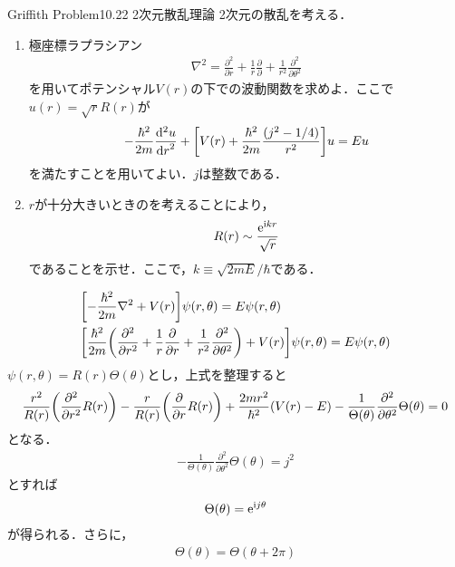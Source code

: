 \documentclass{report}
\begin{document}
  \begin{myexc}{Griffith Problem10.22 2次元散乱理論}{}
    2次元の散乱を考える．
  \begin{enumerate}
    \item 極座標ラプラシアン
    \begin{align}
      \nabla^2 = \frac{\partial^2}{\partial r} + \frac{1}{r}\frac{\partial}{\partial} + \frac{1}{r^2}\frac{\partial^2}{\partial \theta^2}
    \end{align}
    を用いてポテンシャル$V(r)$の下での波動関数を求めよ．ここで$u(r)=\sqrt{r}R(r)$が
    \begin{align}
      -\frac{\hbar^2}{2m}\frac{\mathrm{d}^2 u}{\dd{r}^2} + \qty[V(r) + \frac{\hbar^2}{2m}\frac{(j^2 - 1/4)}{r^2}]u = Eu \label{eq-for-u}
    \end{align}
    を満たすことを用いてよい．$j$は整数である．
    \item $r$が十分大きいときのを考えることにより，
    \begin{align}
      R(r) \sim \frac{\mathrm{e}^{\mathrm{i} kr}}{\sqrt{r}}
    \end{align}
    であることを示せ．ここで，$k\equiv \sqrt{2mE}/\hbar$である．
  \end{enumerate}
    \tcblower
    \begin{align}
      &\qty[-\frac{\hbar^2}{2m}\nabla^2 + V(r)]\psi(r,\theta) = E\psi(r,\theta)\\
      &\qty[\frac{\hbar^2}{2m}\qty(\frac{\partial^2}{\partial r^2} + \frac{1}{r}\frac{\partial}{\partial r} + \frac{1}{r^2}\frac{\partial^2}{\partial \theta^2}) + V(r)]\psi(r,\theta) = E\psi(r,\theta)
    \end{align}
    $\psi(r,\theta) = R(r)\Theta(\theta)$とし，上式を整理すると
    \begin{align}
      \frac{r^2}{R(r)}\qty(\frac{\partial^2}{\partial r^2}R(r)) - \frac{r}{R(r)}\qty(\frac{\partial}{\partial r}R(r)) + \frac{2mr^2}{\hbar^2}(V(r) - E) - \frac{1}{\Theta(\theta)} \frac{\partial^2}{\partial \theta^2}\Theta(\theta) = 0
    \end{align}
    となる．
    \begin{align}
      - \frac{1}{\Theta(\theta)} \frac{\partial^2}{\partial \theta^2}\Theta(\theta) = j^2
    \end{align}
    とすれば
    \begin{align}
      \Theta(\theta) = \mathrm{e}^{\mathrm{i} j\theta}
    \end{align}
    が得られる．さらに，
    \begin{align}
      \Theta(\theta) = \Theta(\theta + 2\pi)

\end{align}
\end{myexc}
\end{document}
